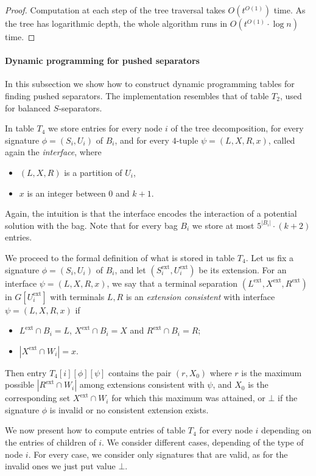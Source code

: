 \documentclass[a4paper,11pt]{article}
\theoremstyle{definition}
\theoremstyle{remark}
\newcommand{\ext}{\textrm{ext}}
\begin{document}
\begin{proof}
  Computation at each step of the tree traversal takes $O(t^{O(1)})$
  time.  As the tree has logarithmic depth, the whole algorithm runs
  in $O(t^{O(1)}\cdot \log n)$ time.
\end{proof}

\paragraph{Dynamic programming for pushed separators}
In this subsection we show how to construct dynamic programming tables
for finding pushed separators.  The implementation resembles that of
table $T_2$, used for balanced $S$-separators.

In table $T_4$ we store entries for every node $i$ of the tree
decomposition, for every signature $\phi=(S_i,U_i)$ of $B_i$, and for
every $4$-tuple $\psi=(L,X,R,x)$, called again the {\emph{interface}},
where
\begin{itemize}
\item $(L,X,R)$ is a partition of $U_i$,
\item $x$ is an integer between $0$ and $k+1$.
\end{itemize}
Again, the intuition is that the interface encodes the interaction of
a potential solution with the bag.  Note that for every bag $B_i$ we
store at most $5^{|B_i|}\cdot (k+2)$ entries.

We proceed to the formal definition of what is stored in table $T_4$.
Let us fix a signature $\phi=(S_i,U_i)$ of $B_i$, and let
$(S^{\ext}_i,U^{\ext}_i)$ be its extension.  For an interface
$\psi=(L,X,R,x)$, we say that a terminal separation $(L^{\ext},
X^{\ext}, R^{\ext})$ in $G[U^{\ext}_i]$ with terminals $L,R$ is an
{\emph{extension consistent}} with interface $\psi=(L,X,R,x)$ if
\begin{itemize}
\item $L^{\ext}\cap B_i=L$, $X^{\ext}\cap B_i=X$ and $R^{\ext}\cap B_i=R$;
\item $|X^{\ext}\cap W_i|=x$.
\end{itemize}
Then entry $T_4[i][\phi][\psi]$ contains the pair $(r,X_0)$ where $r$ is the
maximum possible $|R^{\ext}\cap W_i|$ among extensions consistent with
$\psi$, and $X_0$ is the corresponding set $X^{\ext}\cap W_i$ for
which this maximum was attained, or $\bot$ if the signature $\phi$ is
invalid or no consistent extension exists.

We now present how to compute entries of table $T_4$ for every node
$i$ depending on the entries of children of $i$.  We consider
different cases, depending of the type of node $i$.  For every case,
we consider only signatures that are valid, as for the invalid ones we
just put value $\bot$.  
\end{document}
